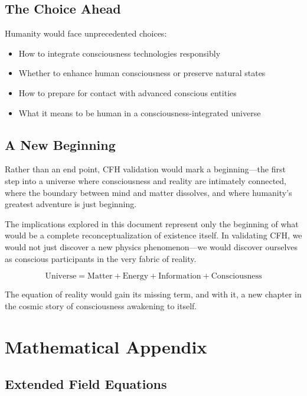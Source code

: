 \documentclass[12pt,article]{memoir}
\begin{document}
\section{The Choice Ahead}

Humanity would face unprecedented choices:

\begin{itemize}
    \item How to integrate consciousness technologies responsibly
    \item Whether to enhance human consciousness or preserve natural states
    \item How to prepare for contact with advanced conscious entities
    \item What it means to be human in a consciousness-integrated universe
\end{itemize}

\section{A New Beginning}

Rather than an end point, CFH validation would mark a beginning—the first step into a universe where consciousness and reality are intimately connected, where the boundary between mind and matter dissolves, and where humanity's greatest adventure is just beginning.

The implications explored in this document represent only the beginning of what would be a complete reconceptualization of existence itself. In validating CFH, we would not just discover a new physics phenomenon—we would discover ourselves as conscious participants in the very fabric of reality.

\begin{equation}
\text{Universe} = \text{Matter} + \text{Energy} + \text{Information} + \boxed{\text{Consciousness}}
\end{equation}

The equation of reality would gain its missing term, and with it, a new chapter in the cosmic story of consciousness awakening to itself.

\appendix

\chapter{Mathematical Appendix}

\section{Extended Field Equations}
\end{document}

